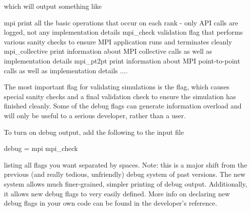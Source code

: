 which will output something like

\begin{ViFile}
    mpi
        print all the basic operations that occur on each rank - only API calls are
        logged, not any implementation details
    mpi_check
        validation flag that performs various sanity checks to ensure MPI application
        runs and terminates cleanly
    mpi_collective
        print information about MPI collective calls as well as implementation details
    mpi_pt2pt
        print information about MPI point-to-point calls as well as implementation
        details
     ....
\end{ViFile}
The most important flag for validating simulations is the  flag,
which causes special sanity checks and a final validation check to ensure the simulation has finished cleanly.
Some of the debug flags can generate information overload and will only be useful to a serious developer, rather than a user.

To turn on debug output, add the following to the input file

\begin{ViFile}
debug = mpi  mpi_check
\end{ViFile}
listing all flags you want separated by spaces.
Note: this is a major shift from the previous (and really tedious, unfriendly) debug system of past versions.
The new system allows much finer-grained, simpler printing of debug output.
Additionally, it allows new debug flags to very easily defined.
More info on declaring new debug flags in your own code can be found in the developer's reference.
